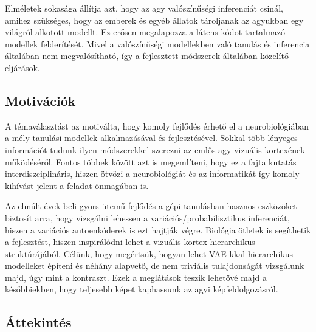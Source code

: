 \documentclass[12pt, english]{article}
\begin{document}
\vspace{4mm}

\par Elméletek sokasága állítja azt, hogy az agy valószínűségi inferenciát csinál, amihez szükséges, hogy az emberek és egyéb állatok tároljanak az agyukban egy világról alkotott modellt. Ez erősen megalapozza a látens kódot tartalmazó modellek felderítését. Mivel a valószínűségi modellekben való tanulás és inferencia általában nem megvalósítható, így a fejlesztett módszerek általában közelítő eljárások.

\vspace{7mm}

\subsection{Motivációk}

\vspace{7mm}

\par A témaválasztást az motiválta, hogy komoly fejlődés érhető el a neurobiológiában a mély tanulási modellek alkalmazásával és fejlesztésével. Sokkal több lényeges információt tudunk ilyen módszerekkel szerezni az emlős agy vizuális kortexének működéséről. Fontos többek között azt is megemlíteni, hogy ez a fajta kutatás interdiszciplináris, hiszen ötvözi a neurobiológiát és az informatikát így komoly kihívást jelent a feladat önmagában is.

\vspace{4mm}

\par Az elmúlt évek beli gyors ütemű fejlődés a gépi tanulásban hasznos eszközöket biztosít arra, hogy vizsgálni lehessen a variációs/probabilisztikus inferenciát, hiszen a variációs autoenkóderek is ezt hajtják végre. Biológia ötletek is segíthetik a fejlesztést, hiszen inspirálódni lehet a vizuális kortex hierarchikus struktúrájából. Célünk, hogy megértsük, hogyan lehet VAE-kkal hierarchikus modelleket építeni és néhány alapvető, de nem triviális tulajdonságát vizsgálunk majd, úgy mint a kontraszt. Ezek a meglátások teszik lehetővé majd a későbbiekben, hogy teljesebb képet kaphassunk az agyi képfeldolgozásról.

\vspace{7mm}

\subsection{Áttekintés}
\end{document}
